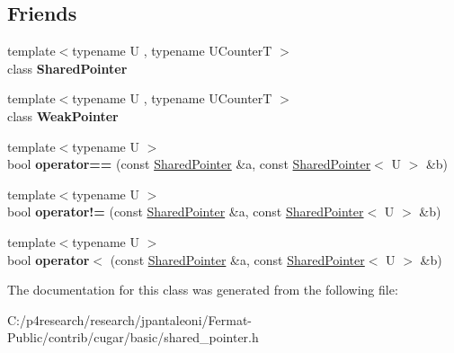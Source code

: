 \subsection*{Friends}
\begin{DoxyCompactItemize}
\item 
\mbox{\label{classcugar_1_1_shared_pointer_a59e9c78b2bbf73f285138119bff21311}} 
{\footnotesize template$<$typename U , typename U\+CounterT $>$ }\\class {\bfseries Shared\+Pointer}
\item 
\mbox{\label{classcugar_1_1_shared_pointer_a43397458ccacac480f107a9680e1e7dd}} 
{\footnotesize template$<$typename U , typename U\+CounterT $>$ }\\class {\bfseries Weak\+Pointer}
\item 
\mbox{\label{classcugar_1_1_shared_pointer_ac09ec64a76fcadd55b09c31dffe529c8}} 
{\footnotesize template$<$typename U $>$ }\\bool {\bfseries operator==} (const \hyperlink{classcugar_1_1_shared_pointer}{Shared\+Pointer} \&a, const \hyperlink{classcugar_1_1_shared_pointer}{Shared\+Pointer}$<$ U $>$ \&b)
\item 
\mbox{\label{classcugar_1_1_shared_pointer_a59d3995aed3c372e97e3b59da7233a0c}} 
{\footnotesize template$<$typename U $>$ }\\bool {\bfseries operator!=} (const \hyperlink{classcugar_1_1_shared_pointer}{Shared\+Pointer} \&a, const \hyperlink{classcugar_1_1_shared_pointer}{Shared\+Pointer}$<$ U $>$ \&b)
\item 
\mbox{\label{classcugar_1_1_shared_pointer_adc901fa7c828e27ec20d72fe408d6118}} 
{\footnotesize template$<$typename U $>$ }\\bool {\bfseries operator$<$} (const \hyperlink{classcugar_1_1_shared_pointer}{Shared\+Pointer} \&a, const \hyperlink{classcugar_1_1_shared_pointer}{Shared\+Pointer}$<$ U $>$ \&b)
\end{DoxyCompactItemize}


The documentation for this class was generated from the following file\+:\begin{DoxyCompactItemize}
\item 
C\+:/p4research/research/jpantaleoni/\+Fermat-\/\+Public/contrib/cugar/basic/shared\+\_\+pointer.\+h\end{DoxyCompactItemize}
